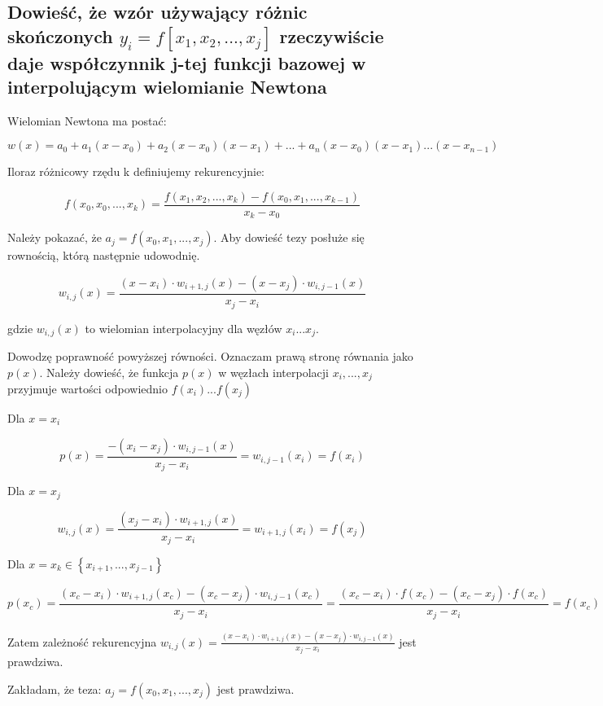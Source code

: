 \documentclass[5]{article}
\begin{document}
\subsection{Dowieść, że wzór używający różnic skończonych $y_{i}= f[x_{1}, x_{2},..., x_{j}]$ rzeczywiście daje współczynnik j-tej funkcji bazowej w interpolującym wielomianie Newtona}

Wielomian Newtona ma postać:

\[w(x)=a_{0}+a_{1}(x-x_{0})+a_{2}(x-x_{0})(x-x_{1})+...+a_{n}(x-x_{0})(x-x_{1})...(x-x_{n-1})\]

Iloraz różnicowy rzędu k definiujemy rekurencyjnie:

\[f(x_{0}, x_{0}, ..., x_{k})= \frac{f(x_{1}, x_{2}, ..., x_{k})-f(x_{0}, x_{1}, ..., x_{k-1})}{x_{k}-x_{0}}\]

Należy pokazać, że $a_{j}=f(x_{0},x_{1},...,x_{j})$.
Aby dowieść tezy posłuże się rownością, którą następnie udowodnię.

\[w_{i,j}(x)=\frac {(x-x_{i}) \cdot w_{i+1,j}(x)-(x-x_{j}) \cdot w_{i,j-1}(x)}{x_{j}-x_{i}}\]

gdzie $w_{i,j}(x)$ to wielomian interpolacyjny dla węzłów $x_{i} ... x_{j}$. \newline

Dowodzę poprawność powyższej równości. Oznaczam prawą stronę równania jako $p(x)$. Należy dowieść, że funkcja $p(x)$ w węzłach interpolacji $x_{i},...,x_{j}$ przyjmuje wartości odpowiednio $f(x_{i}) ... f(x_{j})$
\newline

Dla $x = x_{i}$

\[p(x)=\frac {-(x_{i}-x_{j}) \cdot w_{i,j-1}(x)}{x_{j}-x_{i}} = w_{i,j-1}(x_{i})=f(x_{i})\]

Dla $x = x_{j}$

\[w_{i,j}(x)=\frac {(x_{j}-x_{i}) \cdot w_{i+1,j}(x)}{x_{j}-x_{i}}= w_{i+1,j}(x_{i})=f(x_{j})\]

Dla $x = x_{k}\in \left \{ x_{i+1},..., x_{j-1} \right \}$

\[p(x_{c})=\frac {(x_{c}-x_{i}) \cdot w_{i+1,j}(x_{c})-(x_{c}-x_{j}) \cdot w_{i,j-1}(x_{c})}{x_{j}-x_{i}} = \frac {(x_{c}-x_{i}) \cdot f(x_{c})-(x_{c}-x_{j}) \cdot f(x_{c})}{x_{j}-x_{i}} = f(x_{c})\]

Zatem zależność rekurencyjna $w_{i,j}(x)=\frac {(x-x_{i}) \cdot w_{i+1,j}(x)-(x-x_{j}) \cdot w_{i,j-1}(x)}{x_{j}-x_{i}}$ jest prawdziwa.
\newline

Zakładam, że teza: $a_{j}=f(x_{0},x_{1},...,x_{j})$ jest prawdziwa.\newline
\end{document}
